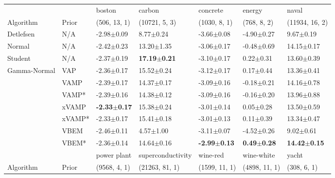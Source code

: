 \begin{tabular}{lllllll}
\toprule
             &       &                   boston &                   carbon &                 concrete &                  energy &                    naval \\
Algorithm & Prior& (506, 13, 1)& (10721, 5, 3)& (1030, 8, 1)& (768, 8, 2)& (11934, 16, 2)\\
\midrule
Detlefsen & N/A &           -2.98$\pm$0.09 &            8.77$\pm$0.24 &           -3.66$\pm$0.08 &          -4.90$\pm$0.27 &            9.67$\pm$0.19 \\
Normal & N/A &           -2.42$\pm$0.23 &           13.20$\pm$1.35 &           -3.06$\pm$0.17 &          -0.48$\pm$0.69 &           14.15$\pm$0.17 \\
Student & N/A &           -2.37$\pm$0.19 &  \textbf{17.19$\pm$0.21} &           -3.10$\pm$0.17 &           0.22$\pm$0.31 &           13.60$\pm$0.39 \\
Gamma-Normal & VAP &           -2.36$\pm$0.17 &           15.52$\pm$0.24 &           -3.12$\pm$0.17 &           0.17$\pm$0.44 &           13.36$\pm$0.41 \\
             & VAMP &           -2.39$\pm$0.17 &           14.37$\pm$0.17 &           -3.09$\pm$0.16 &          -0.18$\pm$0.21 &           14.16$\pm$0.78 \\
             & VAMP* &           -2.39$\pm$0.16 &           14.38$\pm$0.12 &           -3.09$\pm$0.16 &          -0.16$\pm$0.20 &           13.96$\pm$0.88 \\
             & xVAMP &  \textbf{-2.33$\pm$0.17} &           15.38$\pm$0.24 &           -3.01$\pm$0.14 &           0.05$\pm$0.28 &           13.50$\pm$0.59 \\
             & xVAMP* &           -2.33$\pm$0.17 &           15.41$\pm$0.18 &           -3.01$\pm$0.13 &           0.11$\pm$0.39 &           13.34$\pm$0.47 \\
             & VBEM &           -2.46$\pm$0.11 &            4.57$\pm$1.00 &           -3.11$\pm$0.07 &          -4.52$\pm$0.26 &            9.02$\pm$0.61 \\
             & VBEM* &           -2.36$\pm$0.14 &           14.64$\pm$0.16 &  \textbf{-2.99$\pm$0.13} &  \textbf{0.49$\pm$0.28} &  \textbf{14.42$\pm$0.15} \\
\midrule
             &       &              power plant &        superconductivity &                 wine-red &               wine-white &                    yacht \\
Algorithm & Prior& (9568, 4, 1)& (21263, 81, 1)& (1599, 11, 1)& (4898, 11, 1)& (308, 6, 1)\\

\end{tabular}
